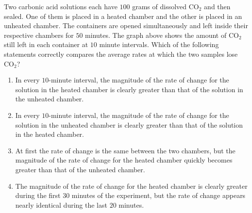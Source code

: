  
\vspace{-3mm}\begin{center}\end{center}
Two carbonic acid solutions each have $100$ grams of dissolved CO$_2$ and then sealed.  One of them is placed in a heated chamber and the other is placed in an unheated chamber.  The containers are opened simultaneously and left inside their respective chambers for $50$ minutes.  The graph above shows the amount of CO$_2$ still left in each container at $10$ minute intervals.  Which of the following statements correctly compares the average rates at which the two samples lose CO$_2$?


\ifsat
	\begin{enumerate}[label=\Alph*)]
		\item In every $10$-minute interval, the magnitude of the rate of change for the solution in the heated chamber is clearly greater than that of the solution in the unheated chamber.
		\item In every $10$-minute interval, the magnitude of the rate of change for the solution in the unheated chamber is clearly greater than that of the solution in the heated chamber.
		\item At first the rate of change is the same between the two chambers, but the magnitude of the rate of change for the heated chamber quickly becomes greater than that of the unheated chamber.
		\item The magnitude of the rate of change for the heated chamber is clearly greater during the first $30$ minutes of the experiment, but the rate of change appears nearly identical during the last $20$ minutes. %
	\end{enumerate}
\else
\fi

